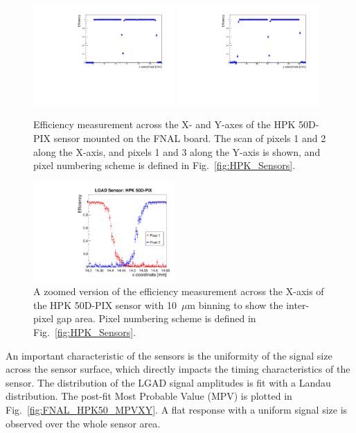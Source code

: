 \documentclass[preprint,1p]{elsarticle}
\begin{document}
\begin{figure}[htbp] 
\centering
\includegraphics[width=0.48\textwidth]{figs/FNALBoard_HPK50DPix_Run847-891/Eff_vs_X_Ch4_5.pdf} 
\includegraphics[width=0.48\textwidth]{figs/FNALBoard_HPK50DPix_Run847-891/Eff_vs_Y_Ch3_4.pdf} 
\caption{Efficiency measurement across the X- and Y-axes of the HPK 50D-PIX sensor mounted on the FNAL board. The scan of pixels 1 and 2 along the X-axis, and pixels 1 and 3 along the Y-axis is shown, and pixel numbering scheme is defined in Fig.~\ref{fig:HPK_Sensors}.} 
\label{fig:FNAL_HPK50_effXY} 
\end{figure} 

\begin{figure}[htbp] 
\centering
\includegraphics[width=0.48\textwidth]{figs/KUBoard_HPK50DPix_Run638-781/EfficiencyInGap_HPK50DPix.pdf} 
\caption{A zoomed version of the efficiency measurement across the X-axis of the HPK 50D-PIX sensor with 10~$\mu$m binning to show the inter-pixel gap area. Pixel numbering scheme is defined in Fig.~\ref{fig:HPK_Sensors}.} 
\label{fig:FNAL_HPK50_ZoomeffXY} 
\end{figure} 

An important characteristic of the sensors is the uniformity of the signal size
across the sensor surface, which directly impacts the timing characteristics of
the sensor. The distribution of the LGAD signal amplitudes is fit with a Landau
distribution. The post-fit Most Probable Value (MPV) is
plotted in Fig.~\ref{fig:FNAL_HPK50_MPVXY}. A flat response with a uniform
signal size is observed over the whole sensor area.
\end{document}
